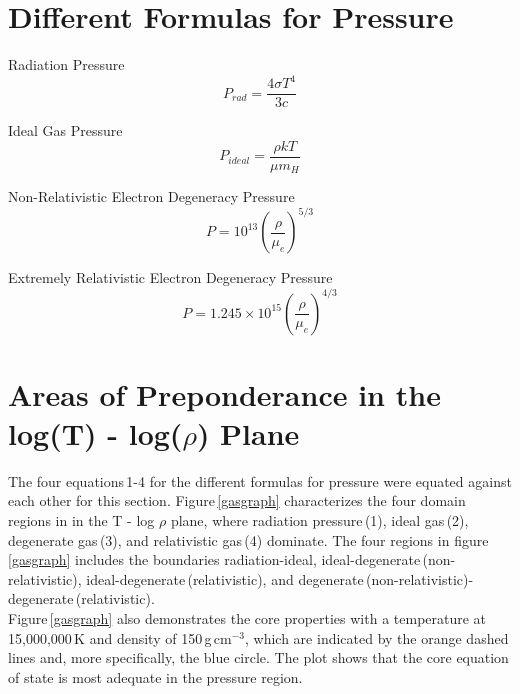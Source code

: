 \documentclass[onecolumn]{aastex6}
\begin{document}

\section{Different Formulas for Pressure}

Radiation Pressure
\begin{equation}
P_{rad} = \frac{4\sigma T^4}{3c}
\label{1}
\end{equation}

Ideal Gas Pressure
\begin{equation}
P_{ideal} = \frac{\rho k T}{\mu m_H}
\label{2}
\end{equation}

Non-Relativistic Electron Degeneracy Pressure
\begin{equation}
P = 10^{13}\left(\frac{\rho}{\mu_e}\right)^{5/3}
\label{3}
\end{equation}

Extremely Relativistic Electron Degeneracy Pressure
\begin{equation}
P = 1.245\times10^{15}\left(\frac{\rho}{\mu_e}\right)^{4/3}
\label{4}
\end{equation}

\section{Areas of Preponderance in the log(T) - log($\rho$) Plane}
The four equations\,1-4 for the different formulas for pressure were equated against each other for this section. Figure\,\ref{gasgraph} characterizes the four domain regions in in the T - log $\rho$ plane, where radiation pressure\,(1), ideal gas\,(2), degenerate gas\,(3), and relativistic gas\,(4) dominate. The four regions in figure\,\ref{gasgraph} includes the boundaries radiation-ideal, ideal-degenerate\,(non-relativistic), ideal-degenerate\,(relativistic), and degenerate\,(non-relativistic)-degenerate\,(relativistic).
\\
\indent Figure\,\ref{gasgraph} also demonstrates the core properties with a temperature at 15,000,000\,K and density of 150\,g\,cm$^{-3}$, which are indicated by the orange dashed lines and, more specifically, the blue circle. The plot shows that the core equation of state is most adequate in the  pressure region.
\end{document}
